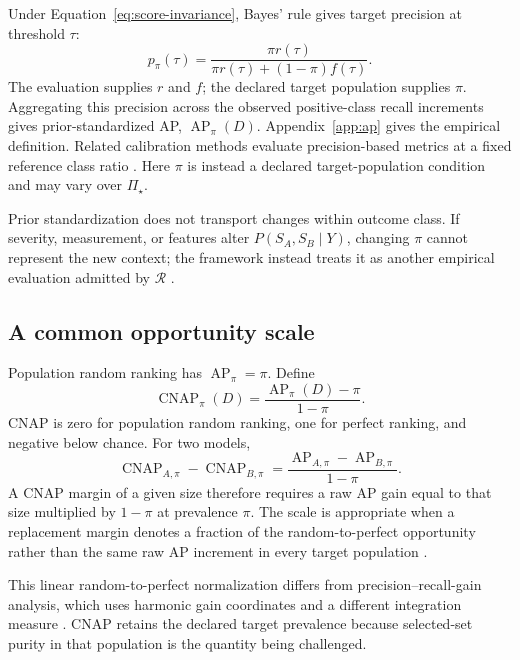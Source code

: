 \documentclass[11pt]{article}
\newcommand{\AP}{\operatorname{AP}}
\newcommand{\CNAP}{\operatorname{CNAP}}
\newcommand{\Regime}{\mathcal{R}}
\newcommand{\PSet}{\Pi_\star}
\theoremstyle{remark}
\begin{document}
Under Equation~\eqref{eq:score-invariance}, Bayes' rule gives target precision
at threshold $\tau$:
\begin{equation}
p_\pi(\tau)
=
\frac{\pi r(\tau)}
{\pi r(\tau)+(1-\pi)f(\tau)}.
\label{eq:reference-precision}
\end{equation}
The evaluation supplies $r$ and $f$; the declared target population supplies
$\pi$. Aggregating this precision across the observed positive-class recall
increments gives prior-standardized AP, $\AP_\pi(D)$. Appendix~\ref{app:ap}
gives the empirical definition. Related calibration methods evaluate
precision-based metrics at a fixed reference class ratio
\cite{siblini2020calibration}. Here $\pi$ is instead a declared target-population
condition and may vary over $\PSet$.

Prior standardization does not transport changes within outcome class. If
severity, measurement, or features alter $P(S_A,S_B\mid Y)$, changing $\pi$
cannot represent the new context; the framework instead treats it as another
empirical evaluation admitted by $\Regime$
\cite{bareinboim2013transportability}.

\subsection{A common opportunity scale}

Population random ranking has $\AP_\pi=\pi$. Define
\begin{equation}
\CNAP_\pi(D)
=
\frac{\AP_\pi(D)-\pi}{1-\pi}.
\label{eq:cnap}
\end{equation}
CNAP is zero for population random ranking, one for perfect ranking, and
negative below chance. For two models,
\begin{equation}
\CNAP_{A,\pi}-\CNAP_{B,\pi}
=
\frac{\AP_{A,\pi}-\AP_{B,\pi}}{1-\pi}.
\label{eq:cnap-difference}
\end{equation}
A CNAP margin of a given size therefore requires a raw AP gain equal to that
size multiplied by $1-\pi$ at prevalence $\pi$. The scale is appropriate when
a replacement margin denotes a fraction
of the random-to-perfect opportunity rather than the same raw AP increment in
every target population \cite{cohen1960coefficient}.

This linear random-to-perfect normalization differs from
precision--recall-gain analysis, which uses harmonic gain coordinates and a
different integration measure \cite{flach2015prg}. CNAP retains the declared
target prevalence because selected-set purity in that population is the
quantity being challenged.
\end{document}
